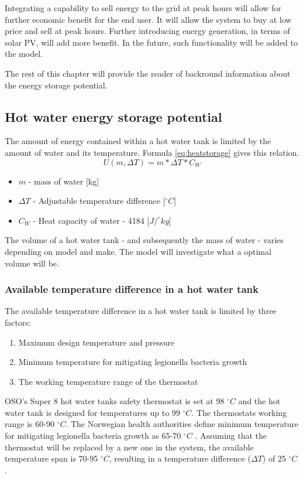 \documentclass[11pt]{article} %
\begin{document}
Integrating a capability to sell energy to the grid at peak hours will allow for further economic benefit for the end user. It will allow the system to buy at low price and sell at peak hours. Further introducing energy generation, in terms of solar PV, will add more benefit. In the future, such functionality will be added to the model.

The rest of this chapter will provide the reader of backround information about the energy storage potential.

\subsection{Hot water energy storage potential}
The amount of energy contained within a hot water tank is limited by the amount of water and its temperature. Formula \ref{eq:heatstorage} gives this relation.
\begin{equation} \label{eq:heatstorage}
U(m,\Delta T) = m*\Delta T*C_{W}
\end{equation}

\begin{itemize}
	\item $m$ - mass of water [kg]
	\item $\Delta T$ - Adjustable temperature difference [$^{\circ}C$]
	\item $C_{W}$ - Heat capacity of water - 4184 [$J/^{\circ}kg$]
\end{itemize}

The volume of a hot water tank - and subsequently the mass of water - varies depending on model and make. The model will investigate what a optimal volume will be.

\subsubsection{Available temperature difference in a hot water tank}
The available temperature difference in a hot water tank is limited by three factors:
\begin{enumerate}
	\item Maximum design temperature and pressure
	\item Minimum temperature for mitigating legionella bacteria growth
	\item The working temperature range of the thermostat 
\end{enumerate}

OSO's Super 8 hot water tanks safety thermostat is set at 98 $^{\circ}C$ and the hot water tank is designed for temperatures up to 99 $^{\circ}C$. The thermostats working range is 60-90 $^{\circ}C$. The Norwegian health authorities define minimum temperature for mitigating legionella bacteria growth as 65-70 $^{\circ}C$ \cite{Legionella2009}. Assuming that the thermostat will be replaced by a new one in the system, the available temperature span is 70-95 $^{\circ}C$, resulting in a temperature difference ($\Delta T$) of 25 $^{\circ}C$.



{}

\end{document}
